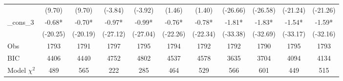 {\begin{tabular*}{\hsize}{@{\hskip\tabcolsep\extracolsep\fill}l*{10}{c}}
                    &      (9.70) &      (9.70) &     (-3.84) &     (-3.92) &      (1.46) &      (1.40) &    (-26.66) &    (-26.58) &    (-21.24) &    (-21.26) \\
\_cons\_3             &       -0.68*&       -0.70*&       -0.97*&       -0.99*&       -0.76*&       -0.78*&       -1.81*&       -1.83*&       -1.54*&       -1.59*\\
                    &    (-20.25) &    (-20.19) &    (-27.12) &    (-27.04) &    (-22.26) &    (-22.34) &    (-33.38) &    (-32.69) &    (-33.17) &    (-32.16) \\
\midrule
Obs                 &        1793 &        1791 &        1797 &        1795 &        1794 &        1792 &        1792 &        1790 &        1795 &        1793 \\
BIC                 &        4406 &        4440 &        4752 &        4802 &        4537 &        4578 &        3635 &        3704 &        4094 &        4134 \\
Model $\chi^{2}$    &         489 &         565 &         222 &         285 &         464 &         529 &         566 &         601 &         449 &         515 \\
\bottomrule
\end{tabular*}
}
